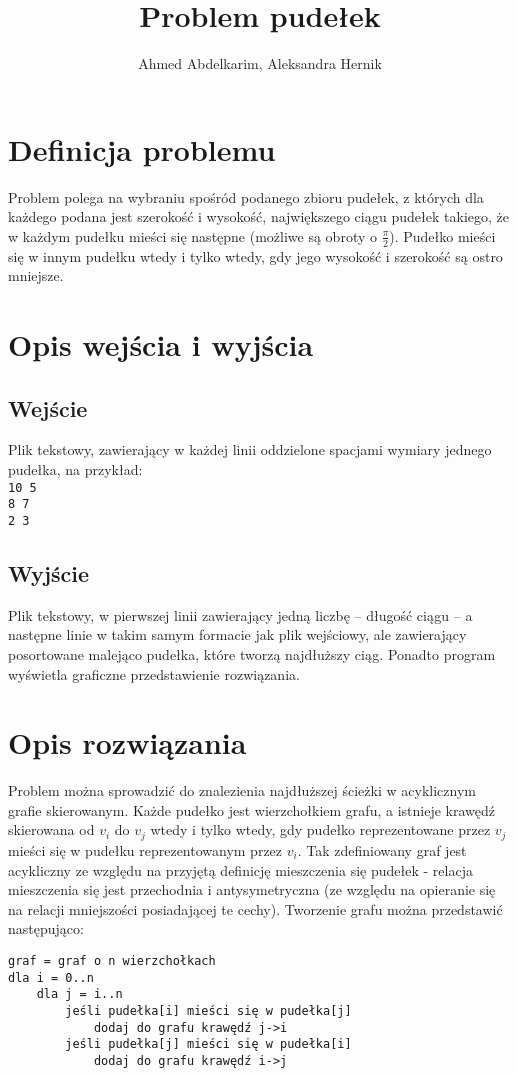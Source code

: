\documentclass{article}
\title{Problem pudełek}
\author{Ahmed Abdelkarim, Aleksandra Hernik}
\begin{document}
\maketitle
\section{Definicja problemu}
Problem polega na wybraniu spośród podanego zbioru pudełek, z których dla każdego podana jest szerokość i wysokość, największego ciągu pudełek takiego, że w każdym pudełku mieści się następne (możliwe są obroty o $\frac{\pi}{2}$). Pudełko mieści się w innym pudełku wtedy i tylko wtedy, gdy jego wysokość i szerokość są ostro mniejsze. 
\section{Opis wejścia i wyjścia}
\subsection{Wejście}
Plik tekstowy, zawierający w każdej linii oddzielone spacjami wymiary jednego pudełka, na przykład:\\
\texttt{10 5\\8 7\\2 3}
\subsection{Wyjście}
Plik tekstowy, w pierwszej linii zawierający jedną liczbę -- długość ciągu -- a następne linie w takim samym formacie jak plik wejściowy, ale zawierający posortowane malejąco pudełka, które tworzą najdłuższy ciąg. Ponadto program wyświetla graficzne przedstawienie rozwiązania.
\section{Opis rozwiązania}
Problem można sprowadzić do znalezienia najdłuższej ścieżki w acyklicznym grafie skierowanym. Każde pudełko jest wierzchołkiem grafu, a istnieje krawędź skierowana od $v_i$ do $v_j$ wtedy i tylko wtedy, gdy pudełko reprezentowane przez $v_j$ mieści się w pudełku reprezentowanym przez $v_i$. Tak zdefiniowany graf jest acykliczny ze względu na przyjętą definicję mieszczenia się pudełek - relacja mieszczenia się jest przechodnia i antysymetryczna (ze względu na opieranie się na relacji mniejszości posiadającej te cechy). Tworzenie grafu można przedstawić następująco:
\begin{verbatim}
graf = graf o n wierzchołkach
dla i = 0..n
	dla j = i..n
		jeśli pudełka[i] mieści się w pudełka[j]
			dodaj do grafu krawędź j->i
		jeśli pudełka[j] mieści się w pudełka[i]
			dodaj do grafu krawędź i->j
\end{verbatim}
\end{document}
